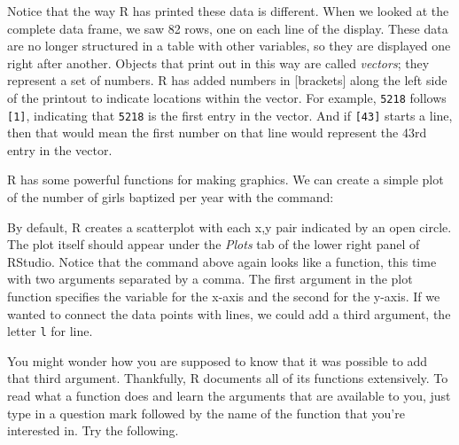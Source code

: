 \documentclass[]{book}
\newenvironment{Shaded}{\begin{snugshade}}{\end{snugshade}}
\newcommand{\KeywordTok}[1]{\textcolor[rgb]{0.13,0.29,0.53}{\textbf{#1}}}
\newcommand{\DataTypeTok}[1]{\textcolor[rgb]{0.13,0.29,0.53}{#1}}
\newcommand{\StringTok}[1]{\textcolor[rgb]{0.31,0.60,0.02}{#1}}
\newcommand{\OperatorTok}[1]{\textcolor[rgb]{0.81,0.36,0.00}{\textbf{#1}}}
\newcommand{\NormalTok}[1]{#1}
\theoremstyle{definition}
\theoremstyle{definition}
\theoremstyle{definition}
\theoremstyle{remark}
\begin{document}
Notice that the way R has printed these data is different. When we
looked at the complete data frame, we saw 82 rows, one on each line of
the display. These data are no longer structured in a table with other
variables, so they are displayed one right after another. Objects that
print out in this way are called \emph{vectors}; they represent a set of
numbers. R has added numbers in {[}brackets{]} along the left side of
the printout to indicate locations within the vector. For example,
\texttt{5218} follows \texttt{{[}1{]}}, indicating that \texttt{5218} is
the first entry in the vector. And if \texttt{{[}43{]}} starts a line,
then that would mean the first number on that line would represent the
43rd entry in the vector.

R has some powerful functions for making graphics. We can create a
simple plot of the number of girls baptized per year with the command:

\begin{Shaded}
\end{Shaded}

By default, R creates a scatterplot with each x,y pair indicated by an
open circle. The plot itself should appear under the \emph{Plots} tab of
the lower right panel of RStudio. Notice that the command above again
looks like a function, this time with two arguments separated by a
comma. The first argument in the plot function specifies the variable
for the x-axis and the second for the y-axis. If we wanted to connect
the data points with lines, we could add a third argument, the letter
\texttt{l} for line.

\begin{Shaded}
\end{Shaded}

You might wonder how you are supposed to know that it was possible to
add that third argument. Thankfully, R documents all of its functions
extensively. To read what a function does and learn the arguments that
are available to you, just type in a question mark followed by the name
of the function that you're interested in. Try the following.
\end{document}
